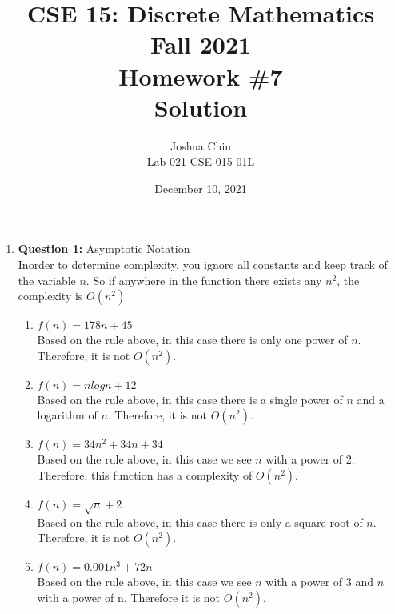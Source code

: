 \documentclass[11pt]{article}
\begin{document}
\author{Joshua Chin\\
Lab 021-CSE 015 01L}

\title{CSE 15: Discrete Mathematics\\
Fall 2021\\
Homework \#7\\
Solution}

\date{December 10, 2021}
\maketitle

\begin{enumerate}

\item
\textbf{Question 1:} Asymptotic Notation \\
Inorder to determine complexity, you ignore all constants and keep track of the variable $n$. So if anywhere in the function there exists any $n^2$, the complexity is $O(n^2)$
\begin{enumerate}[label=(\alph*)]
    \item
    $f(n) = 178n+45$ \\
    Based on the rule above, in this case there is only one power of $n$. Therefore, it is not $O(n^2)$. 
    \item 
    $f(n) = nlogn+12$ \\
    Based on the rule above, in this case there is a single power of $n$ and a logarithm of $n$. Therefore, it is not $O(n^2)$.
    \item 
    $f(n) = 34n^2+34n+34$ \\
    Based on the rule above, in this case we see $n$ with a power of 2. Therefore, this function has a complexity of $O(n^2)$.
    \item 
    $f(n) = \sqrt{n}+2 $ \\
    Based on the rule above, in this case there is only a square root of $n$. Therefore, it is not $O(n^2)$.
    \item 
    $f(n) = 0.001n^3+72n$ \\
    Based on the rule above, in this case we see $n$ with a power of 3 and $n$ with a power of n. Therefore it is not $O(n^2)$.
\end{enumerate}  


\end{enumerate}
\end{document}
